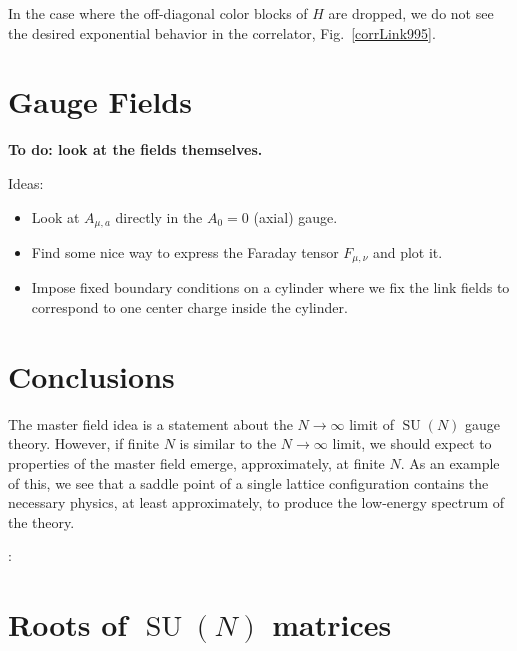 \documentclass[preprint,aps,prd]{revtex4-2}
\DeclareMathOperator{\SU}{SU}
\begin{document}
{In the case where the off-diagonal color blocks of $H$ are dropped,
we do not see the desired exponential behavior in the correlator,
Fig.~\ref{corrLink995}.

\section{Gauge Fields}

{\bf To do:  look at the fields themselves.

  Ideas:
  \begin{itemize}
  \item  Look at $A_{\mu,a}$ directly in the $A_0=0$ (axial) gauge.

  \item Find some nice way to express the Faraday tensor $F_{\mu,\nu}$ and
    plot it.

  \item Impose fixed boundary conditions on a cylinder where we fix the
    link fields to correspond to one center charge inside the
    cylinder.
    
  \end{itemize}
}


\section{Conclusions}

The master field idea is a statement about the $N\to \infty$ limit
of $\SU(N)$ gauge theory.  However, if finite $N$ is similar
to the $N\to\infty$ limit, we should expect to properties of
the master field emerge, approximately, at finite $N$.
As an example of this, we
see that a saddle point of a single lattice configuration
contains the necessary physics, at least approximately, to produce the
low-energy spectrum of the theory.

\vspace{10mm}
:

\appendix

\section{Roots of $\SU(N)$ matrices}
\label{roots}

}
\end{document}
